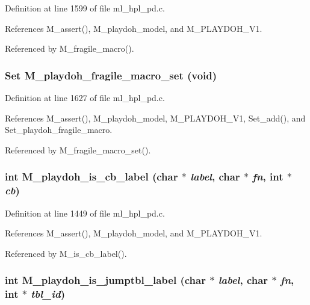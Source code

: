Definition at line 1599 of file ml\_\-hpl\_\-pd.c.

References M\_\-assert(), M\_\-playdoh\_\-model, and M\_\-PLAYDOH\_\-V1.

Referenced by M\_\-fragile\_\-macro().
\subsubsection{\setlength{\rightskip}{0pt plus 5cm}\bf{Set} M\_\-playdoh\_\-fragile\_\-macro\_\-set (void)}\label{ml__hpl__pd_8c_513d2a28e837623e40e7479e0ac39941}




Definition at line 1627 of file ml\_\-hpl\_\-pd.c.

References M\_\-assert(), M\_\-playdoh\_\-model, M\_\-PLAYDOH\_\-V1, Set\_\-add(), and Set\_\-playdoh\_\-fragile\_\-macro.

Referenced by M\_\-fragile\_\-macro\_\-set().
\subsubsection{\setlength{\rightskip}{0pt plus 5cm}int M\_\-playdoh\_\-is\_\-cb\_\-label (char $\ast$ {\em label}, char $\ast$ {\em fn}, int $\ast$ {\em cb})}\label{ml__hpl__pd_8c_678d6462c7ebe8e343e2e73c6d11a817}




Definition at line 1449 of file ml\_\-hpl\_\-pd.c.

References M\_\-assert(), M\_\-playdoh\_\-model, and M\_\-PLAYDOH\_\-V1.

Referenced by M\_\-is\_\-cb\_\-label().
\subsubsection{\setlength{\rightskip}{0pt plus 5cm}int M\_\-playdoh\_\-is\_\-jumptbl\_\-label (char $\ast$ {\em label}, char $\ast$ {\em fn}, int $\ast$ {\em tbl\_\-id})}\label{ml__hpl__pd_8c_87f2f993d8cdf2bf23a2945e51ad7e47}




